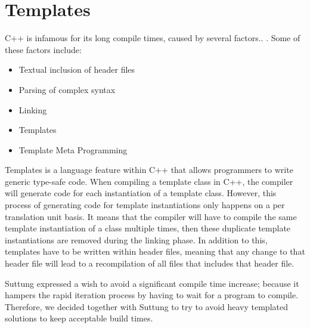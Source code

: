 \section{Templates}
\label{sec:requirements_templates}
C++ is infamous for its long compile times, caused by several factors..
\cite{stack_overflow_why_does_cpp_compilation_take_so_long}.
Some of these factors include:
\begin{itemize}
    \item
    Textual inclusion of header files

    \item
    Parsing of complex syntax

    \item
    Linking

    \item
    Templates

    \item
    Template Meta Programming
\end{itemize}

Templates is a language feature within C++ that allows programmers to write generic type-safe code.
When compiling a template class in C++, the compiler will generate code for each instantiation of a template class.
However, this process of generating code for template instantiations only happens on a per translation unit basis.
It means that the compiler will have to compile the same template instantiation of a class multiple times, then these duplicate template instantiations are removed during the linking phase.
In addition to this, templates have to be written within header files,
meaning that any change to that header file will lead to a recompilation of all files that includes that header file\cite{dr_dobbs_cpp_compilation_speed}.

Suttung expressed a wish to avoid a significant compile time increase; because it hampers the rapid iteration process by having to wait for a program to compile.
Therefore, we decided together with Suttung to try to avoid heavy templated solutions to keep acceptable build times.


